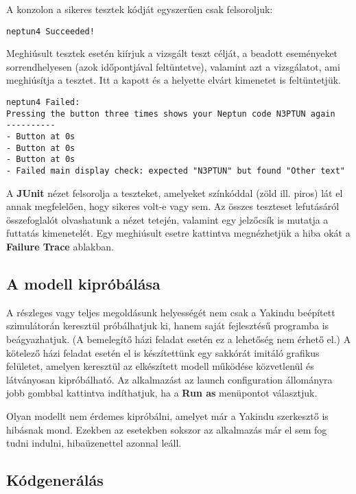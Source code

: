 A konzolon a sikeres tesztek kódját egyszerűen csak felsoroljuk:

\begin{lstlisting}
neptun4 Succeeded!
\end{lstlisting}

Meghiúsult tesztek esetén kiírjuk a vizsgált teszt célját, a beadott eseményeket sorrendhelyesen (azok időpontjával feltüntetve), valamint azt a vizsgálatot, ami meghiúsítja a tesztet. Itt a kapott és a helyette elvárt kimenetet is feltüntetjük.

\begin{lstlisting}
neptun4 Failed:
Pressing the button three times shows your Neptun code N3PTUN again
----------
- Button at 0s
- Button at 0s
- Button at 0s
- Failed main display check: expected "N3PTUN" but found "Other text"
\end{lstlisting}

A \textbf{JUnit} nézet felsorolja a teszteket, amelyeket színkóddal (zöld ill. piros) lát el annak megfelelően, hogy sikeres volt-e vagy sem. Az összes teszteset lefutásáról összefoglalót olvashatunk a nézet tetején, valamint egy jelzőcsík is mutatja a futtatás kimenetelét. Egy meghiúsult esetre kattintva megnézhetjük a hiba okát a \textbf{Failure Trace} ablakban.

\subsection{A modell kipróbálása}

A részleges vagy teljes megoldásunk helyességét nem csak a Yakindu beépített szimulátorán keresztül próbálhatjuk ki, hanem saját fejlesztésű programba is beágyazhatjuk. (A bemelegítő házi feladat esetén ez a lehetőség nem érhető el.) A kötelező házi feladat esetén el is készítettünk egy sakkórát imitáló grafikus felületet, amelyen keresztül az elkészített modell működése közvetlenül és látványosan kipróbálható. Az alkalmazást az  launch configuration állományra jobb gombbal kattintva indíthatjuk, ha a \textbf{Run as} menüpontot választjuk.

\begin{megjegyzes}
	Olyan modellt nem érdemes kipróbálni, amelyet már a Yakindu szerkesztő is hibásnak mond. Ezekben az esetekben sokszor az alkalmazás már el sem fog tudni indulni, hibaüzenettel azonnal leáll.
\end{megjegyzes}

\subsection{Kódgenerálás}

